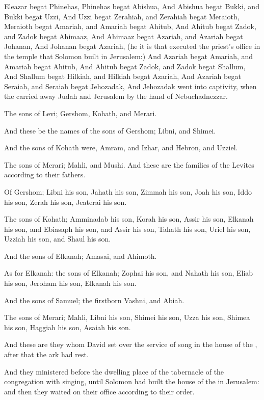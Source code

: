 \Verse Eleazar begat Phinehas, Phinehas begat Abishua, \Verse And Abishua begat Bukki, and Bukki begat Uzzi, \Verse And Uzzi begat Zerahiah, and Zerahiah begat Meraioth, \Verse Meraioth begat Amariah, and Amariah begat Ahitub, \Verse And Ahitub begat Zadok, and Zadok begat Ahimaaz, \Verse And Ahimaaz begat Azariah, and Azariah begat Johanan, \Verse And Johanan begat Azariah, (he it is that executed the priest's office in the temple that Solomon built in Jerusalem:) \Verse And Azariah begat Amariah, and Amariah begat Ahitub, \Verse And Ahitub begat Zadok, and Zadok begat Shallum, \Verse And Shallum begat Hilkiah, and Hilkiah begat Azariah, \Verse And Azariah begat Seraiah, and Seraiah begat Jehozadak, \Verse And Jehozadak went into captivity, when the \LORD carried away Judah and Jerusalem by the hand of Nebuchadnezzar.

\Verse The sons of Levi; Gershom, Kohath, and Merari.

\Verse And these be the names of the sons of Gershom; Libni, and Shimei.

\Verse And the sons of Kohath were, Amram, and Izhar, and Hebron, and Uzziel.

\Verse The sons of Merari; Mahli, and Mushi. And these are the families of the Levites according to their fathers.

\Verse Of Gershom; Libni his son, Jahath his son, Zimmah his son, \Verse Joah his son, Iddo his son, Zerah his son, Jeaterai his son.

\Verse The sons of Kohath; Amminadab his son, Korah his son, Assir his son, \Verse Elkanah his son, and Ebiasaph his son, and Assir his son, \Verse Tahath his son, Uriel his son, Uzziah his son, and Shaul his son.

\Verse And the sons of Elkanah; Amasai, and Ahimoth.

\Verse As for Elkanah: the sons of Elkanah; Zophai his son, and Nahath his son, \Verse Eliab his son, Jeroham his son, Elkanah his son.

\Verse And the sons of Samuel; the firstborn Vashni, and Abiah.

\Verse The sons of Merari; Mahli, Libni his son, Shimei his son, Uzza his son, \Verse Shimea his son, Haggiah his son, Asaiah his son.

\Verse And these are they whom David set over the service of song in the house of the \LORD, after that the ark had rest.

\Verse And they ministered before the dwelling place of the tabernacle of the congregation with singing, until Solomon had built the house of the \LORD in Jerusalem: and then they waited on their office according to their order.

